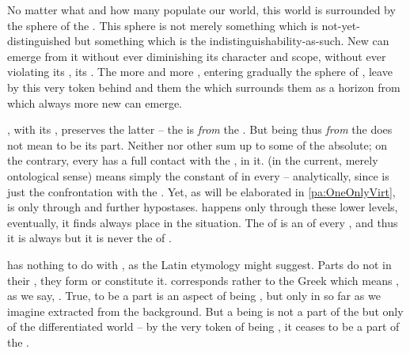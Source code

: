 No matter what and how many  populate our world, this world is
surrounded by the sphere of the . This sphere is
not merely something which is not-yet-distinguished but something which is the
indistinguishability-as-such. New  can emerge from it without
ever diminishing its character and scope, without ever violating
its , its . The more
and more , entering gradually the sphere of
, leave by this very token behind and  them the
 which surrounds them as a horizon from which always more
new  can emerge.

\pa {},  with its , preserves the
latter -- the  is  {\em from} the . But being
thus  {\em from} the  does not mean to be its part. 
Neither  nor other
 sum up to some   of the
{absolute}; on the contrary, every  has a full contact with the
,  in it.   (in the current,
merely ontological sense) means simply the constant  of  in
every  -- analytically, since  is just the
confrontation with the .  Yet, as will be elaborated in
\ref{pa:OneOnlyVirt},  is  only through  and
further hypostases.  happens only through these
lower levels, eventually, it finds always place in the  situation.
The  of  is an  of every ,
and thus it is always  but it is never the  of
.

 has nothing to do with , as the Latin
etymology might suggest. Parts do not  in their ,
they form or constitute it.   corresponds rather to the Greek
 which means , as we say, .  True, to be a part is an aspect of being
, but only in so far as we imagine  extracted from
the background. But a  being is not a part of the
 but only of the differentiated world -- by the very token of
being , it ceases to be a part of the .

